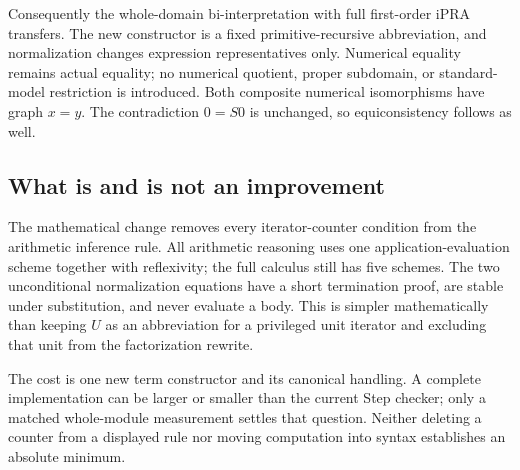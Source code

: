 Consequently the whole-domain bi-interpretation with full first-order
iPRA transfers.  The new constructor is a fixed primitive-recursive
abbreviation, and normalization changes expression representatives
only.  Numerical equality remains actual equality; no numerical
quotient, proper subdomain, or standard-model restriction is introduced.
Both composite numerical isomorphisms have graph $x=y$.  The
contradiction $0=S0$ is unchanged, so equiconsistency follows as well.

\subsection{What is and is not an improvement}

The mathematical change removes every iterator-counter condition from
the arithmetic inference rule.  All arithmetic reasoning uses one
application-evaluation scheme together with reflexivity; the full
calculus still has five schemes.  The two unconditional normalization
equations have a short termination proof, are stable under substitution,
and never evaluate a body.  This is simpler mathematically than keeping
$U$ as an abbreviation for a privileged unit iterator and excluding
that unit from the factorization rewrite.

The cost is one new term constructor and its canonical handling.  A
complete implementation can be larger or smaller than the current
Step checker; only a matched whole-module measurement settles that
question.  Neither deleting a counter from a displayed rule nor
moving computation into syntax establishes an absolute minimum.
